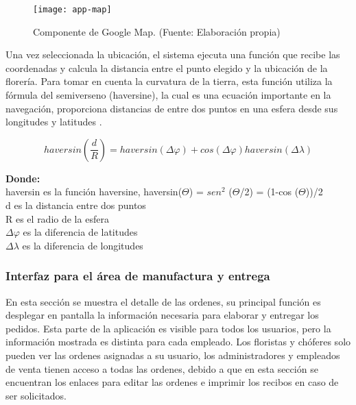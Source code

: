 \begin{figure}[H]
  \centering
  \texttt{[image: app-map]}
  \caption{Componente de Google Map. (Fuente: Elaboración propia)}
\end{figure}

Una vez seleccionada la ubicación, el sistema ejecuta una función que recibe las coordenadas y calcula la distancia entre el punto elegido y la ubicación de la florería. Para tomar en cuenta la curvatura de la tierra, esta función utiliza la fórmula del semiverseno (haversine), la cual es una ecuación importante en la navegación, proporciona distancias de entre dos puntos en una esfera desde sus longitudes y latitudes \cite{anisya}.

\[ 
  haversin\left(\frac{d}{R}\right) = haversin(\Delta\varphi) + cos(\Delta\varphi)haversin(\Delta\lambda)
\]

\textbf{Donde:}\\
\-\hspace{0.5cm} haversin es la función haversine, haversin($\Theta$) = $sen^2$ ($\Theta$/2) = (1-cos ($\Theta$))/2\\
\-\hspace{0.5cm} d es la distancia entre dos puntos\\
\-\hspace{0.5cm} R es el radio de la esfera\\
\-\hspace{0.5cm} $\Delta\varphi$ es la diferencia de latitudes\\
\-\hspace{0.5cm} $\Delta\lambda$ es la diferencia de longitudes
\vspace{0.8cm}



\subsubsection{Interfaz para el área de manufactura y entrega}
En esta sección se muestra el detalle de las ordenes, su principal función es desplegar en pantalla la información necesaria para elaborar y entregar los pedidos. Esta parte de la aplicación es visible para todos los usuarios, pero la información mostrada es distinta para cada empleado. Los floristas y chóferes solo pueden ver las ordenes asignadas a su usuario, los administradores y empleados de venta tienen acceso a todas las ordenes, debido a que en esta sección se encuentran los enlaces para editar las ordenes e imprimir los recibos en caso de ser solicitados.
\vspace{0.8cm}

